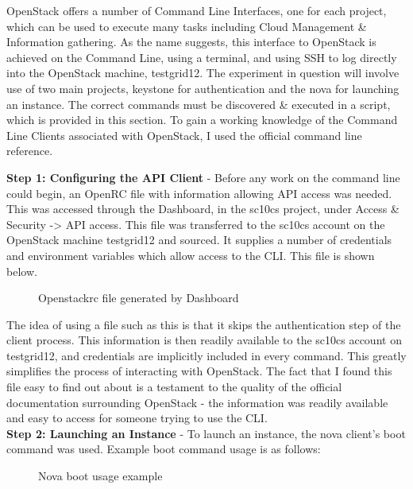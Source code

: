 OpenStack offers a number of Command Line Interfaces, one for each project, which can be used to execute many tasks including Cloud Management \& Information gathering. As the name suggests, this interface to OpenStack is achieved on the Command Line, using a terminal, and using SSH to log directly into the OpenStack machine, testgrid12. The experiment in question will involve use of two main projects, keystone for authentication and the nova for launching an instance. The correct commands must be discovered \& executed in a script, which is provided in this section. To gain a working knowledge of the Command Line Clients associated with OpenStack, I used the official command line reference\cite{openstackcli}.

\textbf{Step 1: Configuring the API Client} - Before any work on the command line could begin, an OpenRC file with information allowing API access was needed. This was accessed through the Dashboard, in the sc10cs project, under Access \& Security -> API access. This file was transferred to the sc10cs account on the OpenStack machine testgrid12 and sourced. It supplies a number of credentials and environment variables which allow access to the CLI. This file is shown below. \\

\begin{figure}[H]
\centering
{}
\caption{Openstackrc file generated by Dashboard}
\end{figure}


The idea of using a file such as this is that it skips the authentication step of the client process. This information is then readily available to the sc10cs account on testgrid12, and credentials are implicitly included in every command. This greatly simplifies the process of interacting with OpenStack.
The fact that I found this file easy to find out about is a testament to the quality of the official documentation surrounding OpenStack - the information was readily available and easy to access for someone trying to use the CLI.
 \\

\textbf{Step 2: Launching an Instance }- To launch an instance, the nova client's boot command was used. Example boot command usage is as follows:
\begin{figure}[H]
\centering
{}
\caption{Nova boot usage example}
\end{figure}

